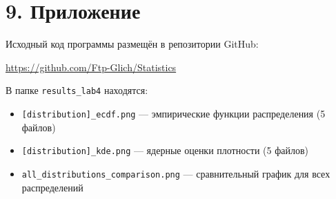 \documentclass[a4paper,14pt]{extarticle}
\begin{document}
\section*{9. Приложение}

Исходный код программы размещён в репозитории GitHub:

\url{https://github.com/Ftp-Glich/Statistics}

В папке \texttt{results\_lab4} находятся:
\begin{itemize}
    \item \texttt{[distribution]\_ecdf.png} — эмпирические функции распределения (5 файлов)
    \item \texttt{[distribution]\_kde.png} — ядерные оценки плотности (5 файлов)
    \item \texttt{all\_distributions\_comparison.png} — сравнительный график для всех распределений
\end{itemize}
\end{document}

